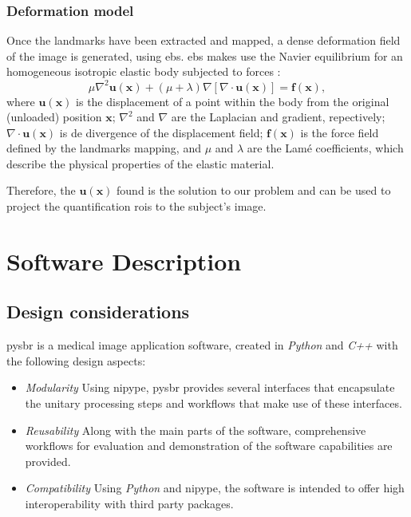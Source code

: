 \documentclass{frontiers}
\newcommand{\vect}[1]{\ensuremath{\mathbf{#1}}}
\newcommand{\emitem}[1]{\item \emph{#1}}
\begin{document}
\subsubsection{Deformation model}
\label{sec:deformation}
Once the landmarks have been extracted and mapped, a dense deformation field of the image
  is generated, using \gls*{ebs}. \gls*{ebs} makes use the Navier 
  equilibrium  for an homogeneous isotropic elastic body
  subjected to forces \citep{davis_physics-based_1997}:
  \begin{equation}
    \label{eq:ebs_pde}
    \mu \nabla^2 \vect{u}(\vect{x}) + (\mu+\lambda) \nabla \left[ \nabla \cdot \vect{u}(\vect{x}) \right] = \vect{f}(\vect{x}),
  \end{equation}
  where $\vect{u}(\vect{x})$ is the displacement of a point within the body
  from the original (unloaded) position $\vect{x}$; $\nabla^2$ and $\nabla$
  are the Laplacian and gradient, repectively; $\nabla \cdot \vect{u}(\vect{x})$
  is de divergence of the displacement field; $\vect{f}(\vect{x})$ is the force
  field defined by the landmarks mapping, and $\mu$ and $\lambda$ are the Lam\'e
  coefficients, which describe the physical properties of the elastic material.

Therefore, the $\vect{u}(\vect{x})$ found is the solution to our problem and
  can be used to project the quantification \glspl*{roi} to the subject's image.

\section{Software Description}
\label{sec:software}
\subsection{Design considerations}
\label{sec:design}

\Gls*{pysbr} is a medical image application software, created
  in \emph{Python} and \emph{C++} with the following design aspects:

\begin{itemize}
  \emitem{Modularity} Using \gls*{nipype}, \gls*{pysbr} provides
    several interfaces that encapsulate the unitary processing steps
    and workflows that make use of these interfaces.

  \emitem{Reusability} Along with the main parts of the software,
    comprehensive workflows for evaluation and demonstration of the 
    software capabilities are provided.

  \emitem{Compatibility} Using \emph{Python} and \gls*{nipype}, the
    software is intended to offer high interoperability with third party
      packages.
\end{itemize}
\end{document}
